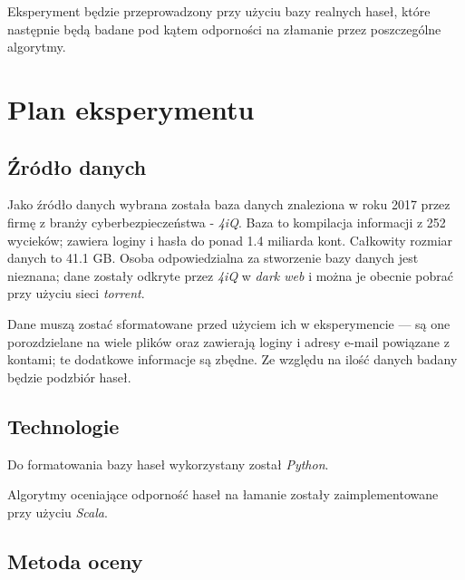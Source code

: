 \documentclass{article}
\begin{document}
Eksperyment będzie przeprowadzony przy użyciu bazy realnych haseł, które następnie będą badane pod kątem odporności na złamanie przez poszczególne algorytmy.

\section{Plan eksperymentu}
\subsection{Źródło danych}
Jako źródło danych wybrana została baza danych znaleziona w roku 2017 przez firmę z branży cyberbezpieczeństwa - \textit{4iQ}. Baza to kompilacja informacji z 252 wycieków; zawiera loginy i hasła do ponad 1.4 miliarda kont. Całkowity rozmiar danych to 41.1 GB. Osoba odpowiedzialna za stworzenie bazy danych jest nieznana; dane zostały odkryte przez \textit{4iQ} w \textit{dark web} i można je obecnie pobrać przy użyciu sieci \textit{torrent}.

Dane muszą zostać sformatowane przed użyciem ich w eksperymencie — są one porozdzielane na wiele plików oraz zawierają loginy i adresy e-mail powiązane z kontami; te dodatkowe informacje są zbędne. Ze względu na ilość danych badany będzie podzbiór haseł.

\subsection{Technologie}
Do formatowania bazy haseł wykorzystany został \textit{Python}.

Algorytmy oceniające odporność haseł na łamanie zostały zaimplementowane przy użyciu \textit{Scala}.

\subsection{Metoda oceny}
\end{document}
